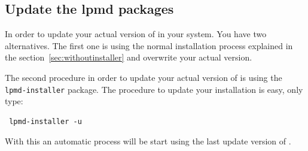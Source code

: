 \subsection{Update the lpmd packages}

In order to update your actual version of {\lpmd} in your system. You have two
alternatives. The first one is using the normal installation process explained
in the section~\ref{sec:withoutinstaller} and overwrite your actual version.

The second procedure in order to update your actual version of {\lpmd} is using
the \verb|lpmd-installer| package. The procedure to update your installation is
easy, only type:

\begin{verbatim}
 lpmd-installer -u
\end{verbatim}
\noindent
With this an automatic process will be start using the last update version of
{\lpmd}.
